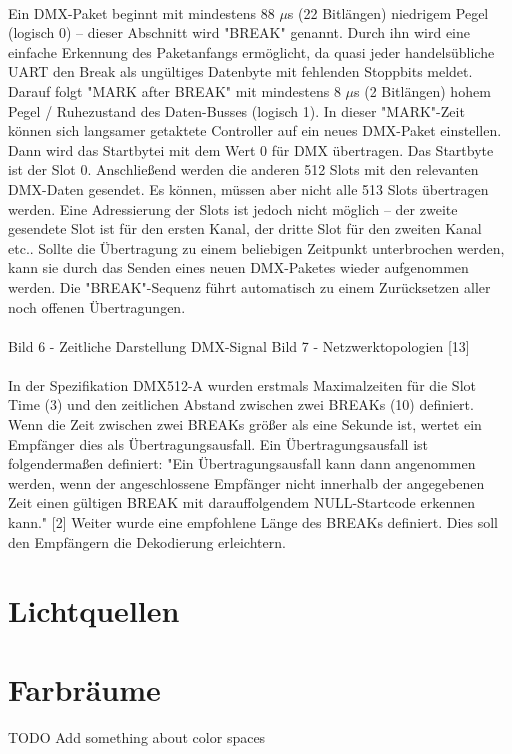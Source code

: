 \documentclass[11pt]{scrartcl}
\begin{document}
\\
Ein DMX-Paket beginnt mit mindestens 88 $\mu$s (22 Bitlängen) niedrigem Pegel (logisch 0) – dieser
Abschnitt wird "BREAK" genannt. Durch ihn wird eine einfache Erkennung des Paketanfangs
ermöglicht, da quasi jeder handelsübliche UART den Break als ungültiges Datenbyte mit fehlenden
Stoppbits meldet. Darauf folgt "MARK after BREAK" mit mindestens 8 $\mu$s (2 Bitlängen) hohem Pegel /
Ruhezustand des Daten-Busses (logisch 1). In dieser "MARK"-Zeit können sich langsamer getaktete
Controller auf ein neues DMX-Paket einstellen. Dann wird das Startbytei mit dem Wert 0 für DMX
übertragen. Das Startbyte ist der Slot 0. Anschließend werden die anderen 512 Slots mit den
relevanten DMX-Daten gesendet. Es können, müssen aber nicht alle 513 Slots übertragen werden.
Eine Adressierung der Slots ist jedoch nicht möglich – der zweite gesendete Slot ist für den ersten
Kanal, der dritte Slot für den zweiten Kanal etc.. Sollte die Übertragung zu einem beliebigen
Zeitpunkt unterbrochen werden, kann sie durch das Senden eines neuen DMX-Paketes wieder
aufgenommen werden. Die "BREAK"-Sequenz führt automatisch zu einem Zurücksetzen aller noch
offenen Übertragungen.\\
\\
Bild 6 - Zeitliche Darstellung DMX-Signal
Bild 7 - Netzwerktopologien [13]\\
\\
In der Spezifikation DMX512-A wurden erstmals Maximalzeiten für die Slot Time (3) und den
zeitlichen Abstand zwischen zwei BREAKs (10) definiert. Wenn die Zeit zwischen zwei BREAKs größer
als eine Sekunde ist, wertet ein Empfänger dies als Übertragungsausfall. Ein Übertragungsausfall ist
folgendermaßen definiert: "Ein Übertragungsausfall kann dann angenommen werden, wenn der
angeschlossene Empfänger nicht innerhalb der angegebenen Zeit einen gültigen BREAK mit
darauffolgendem NULL-Startcode erkennen kann." [2] Weiter wurde eine empfohlene Länge des
BREAKs definiert. Dies soll den Empfängern die Dekodierung erleichtern.
\clearpage

\section{Lichtquellen}
\clearpage

\section{Farbräume}
TODO Add something about color spaces
\clearpage
\end{document}
